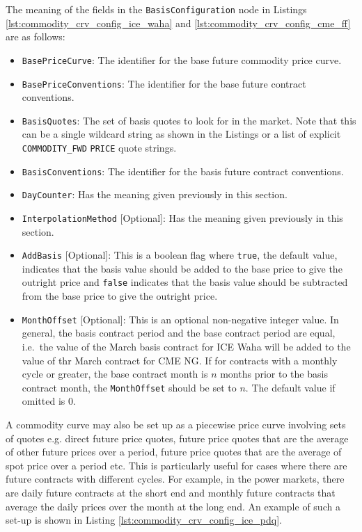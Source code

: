 \documentclass[12pt, a4paper]{article}
\begin{document}
{{The meaning of the fields in the \lstinline!BasisConfiguration! node in Listings \ref{lst:commodity_crv_config_ice_waha} and \ref{lst:commodity_crv_config_cme_ff} are as follows:
\begin{itemize}
\item \lstinline!BasePriceCurve!: The identifier for the base future commodity price curve.
\item \lstinline!BasePriceConventions!: The identifier for the base future contract conventions.
\item \lstinline!BasisQuotes!: The set of basis quotes to look for in the market. Note that this can be a single wildcard string as shown in the Listings or a list of explicit \lstinline!COMMODITY_FWD! \lstinline!PRICE! quote strings.
\item \lstinline!BasisConventions!: The identifier for the basis future contract conventions.
\item \lstinline!DayCounter!: Has the meaning given previously in this section.
\item \lstinline!InterpolationMethod! [Optional]: Has the meaning given previously in this section.
\item \lstinline!AddBasis! [Optional]: This is a boolean flag where \lstinline!true!, the default value, indicates that the basis value should be added to the base price to give the outright price and \lstinline!false! indicates that the basis value should be subtracted from the base price to give the outright price.
\item \lstinline!MonthOffset! [Optional]: This is an optional non-negative integer value. In general, the basis contract period and the base contract period are equal, i.e.\ the value of the March basis contract for ICE Waha will be added to the value of thr March contract for CME NG. If for contracts with a monthly cycle or greater, the base contract month is $n$ months prior to the basis contract month, the \lstinline!MonthOffset! should be set to $n$. The default value if omitted is 0.
\end{itemize}

A commodity curve may also be set up as a piecewise price curve involving sets of quotes e.g. direct future price quotes, future price quotes that are the average of other future prices over a period, future price quotes that are the average of spot price over a period etc. This is particularly useful for cases where there are future contracts with different cycles. For example, in the power markets, there are daily future contracts at the short end and monthly future contracts that average the daily prices over the month at the long end. An example of such a set-up is shown in Listing \ref{lst:commodity_crv_config_ice_pdq}.

}}
\end{document}
